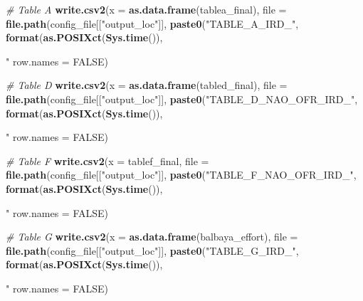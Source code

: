 \documentclass[]{article}
\newenvironment{Shaded}{\begin{snugshade}}{\end{snugshade}}
\newcommand{\CharTok}[1]{\textcolor[rgb]{0.31,0.60,0.02}{#1}}
\newcommand{\CommentTok}[1]{\textcolor[rgb]{0.56,0.35,0.01}{\textit{#1}}}
\newcommand{\DataTypeTok}[1]{\textcolor[rgb]{0.13,0.29,0.53}{#1}}
\newcommand{\KeywordTok}[1]{\textcolor[rgb]{0.13,0.29,0.53}{\textbf{#1}}}
\newcommand{\NormalTok}[1]{#1}
\newcommand{\OtherTok}[1]{\textcolor[rgb]{0.56,0.35,0.01}{#1}}
\newcommand{\StringTok}[1]{\textcolor[rgb]{0.31,0.60,0.02}{#1}}
\begin{document}
\begin{Shaded}
\begin{Highlighting}[]
\CommentTok{# Table A}
\KeywordTok{write.csv2}\NormalTok{(}\DataTypeTok{x =} \KeywordTok{as.data.frame}\NormalTok{(tablea_final), }
    \DataTypeTok{file =} \KeywordTok{file.path}\NormalTok{(config_file[[}\StringTok{"output_loc"}\NormalTok{]], }
        \KeywordTok{paste0}\NormalTok{(}\StringTok{"TABLE_A_IRD_"}\NormalTok{, }\KeywordTok{format}\NormalTok{(}\KeywordTok{as.POSIXct}\NormalTok{(}\KeywordTok{Sys.time}\NormalTok{()), }
            \StringTok{"%Y%m%d_%H%M%S"}\NormalTok{), }\StringTok{".csv"}\NormalTok{), }\DataTypeTok{fsep =} \StringTok{"}\CharTok{\textbackslash{}\textbackslash{}}\StringTok{"}\NormalTok{), }
    \DataTypeTok{row.names =} \OtherTok{FALSE}\NormalTok{)}

\CommentTok{# Table D}
\KeywordTok{write.csv2}\NormalTok{(}\DataTypeTok{x =} \KeywordTok{as.data.frame}\NormalTok{(tabled_final), }
    \DataTypeTok{file =} \KeywordTok{file.path}\NormalTok{(config_file[[}\StringTok{"output_loc"}\NormalTok{]], }
        \KeywordTok{paste0}\NormalTok{(}\StringTok{"TABLE_D_NAO_OFR_IRD_"}\NormalTok{, }\KeywordTok{format}\NormalTok{(}\KeywordTok{as.POSIXct}\NormalTok{(}\KeywordTok{Sys.time}\NormalTok{()), }
            \StringTok{"%Y%m%d_%H%M%S"}\NormalTok{), }\StringTok{".csv"}\NormalTok{), }\DataTypeTok{fsep =} \StringTok{"}\CharTok{\textbackslash{}\textbackslash{}}\StringTok{"}\NormalTok{), }
    \DataTypeTok{row.names =} \OtherTok{FALSE}\NormalTok{)}

\CommentTok{# Table F}
\KeywordTok{write.csv2}\NormalTok{(}\DataTypeTok{x =}\NormalTok{ tablef_final, }\DataTypeTok{file =} \KeywordTok{file.path}\NormalTok{(config_file[[}\StringTok{"output_loc"}\NormalTok{]], }
    \KeywordTok{paste0}\NormalTok{(}\StringTok{"TABLE_F_NAO_OFR_IRD_"}\NormalTok{, }\KeywordTok{format}\NormalTok{(}\KeywordTok{as.POSIXct}\NormalTok{(}\KeywordTok{Sys.time}\NormalTok{()), }
        \StringTok{"%Y%m%d_%H%M%S"}\NormalTok{), }\StringTok{".csv"}\NormalTok{), }\DataTypeTok{fsep =} \StringTok{"}\CharTok{\textbackslash{}\textbackslash{}}\StringTok{"}\NormalTok{), }
    \DataTypeTok{row.names =} \OtherTok{FALSE}\NormalTok{)}

\CommentTok{# Table G}
\KeywordTok{write.csv2}\NormalTok{(}\DataTypeTok{x =} \KeywordTok{as.data.frame}\NormalTok{(balbaya_effort), }
    \DataTypeTok{file =} \KeywordTok{file.path}\NormalTok{(config_file[[}\StringTok{"output_loc"}\NormalTok{]], }
        \KeywordTok{paste0}\NormalTok{(}\StringTok{"TABLE_G_IRD_"}\NormalTok{, }\KeywordTok{format}\NormalTok{(}\KeywordTok{as.POSIXct}\NormalTok{(}\KeywordTok{Sys.time}\NormalTok{()), }
            \StringTok{"%Y%m%d_%H%M%S"}\NormalTok{), }\StringTok{".csv"}\NormalTok{), }\DataTypeTok{fsep =} \StringTok{"}\CharTok{\textbackslash{}\textbackslash{}}\StringTok{"}\NormalTok{), }
    \DataTypeTok{row.names =} \OtherTok{FALSE}\NormalTok{)}

}}}}
\end{Highlighting}
\end{Shaded}
\end{document}
